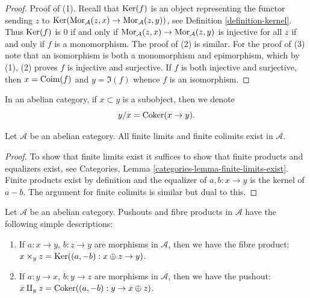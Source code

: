 \begin{proof}
Proof of (1). Recall that $\mathop{\mathrm{Ker}}(f)$ is an
object representing the
functor sending $z$ to
$\mathop{\mathrm{Ker}}(\mathop{\mathrm{Mor}}\nolimits_\mathcal{A}(z, x) \to
\mathop{\mathrm{Mor}}\nolimits_\mathcal{A}(z, y))$, see
Definition \ref{definition-kernel}.
Thus $\mathop{\mathrm{Ker}}(f)$ is $0$ if and only if
$\mathop{\mathrm{Mor}}\nolimits_\mathcal{A}(z, x) \to
\mathop{\mathrm{Mor}}\nolimits_\mathcal{A}(z, y)$
is injective for all $z$ if and only if $f$
is a monomorphism.
The proof of (2) is similar.
For the proof of (3) note that an isomorphism
is both a monomorphism
and epimorphism, which by (1), (2) proves $f$
is injective
and surjective. If $f$ is both injective and
surjective, then
$x = \mathop{\mathrm{Coim}}(f)$ and $y = \Im(f)$ whence $f$ is
an isomorphism.
\end{proof}

\noindent
In an abelian category, if $x \subset y$ is a
subobject,
then we denote
$$
y/x = \mathop{\mathrm{Coker}}(x \to y).
$$

\begin{lemma}
\label{lemma-colimit-abelian-category}
Let $\mathcal{A}$ be an abelian category.
All finite limits and finite colimits exist
in $\mathcal{A}$.
\end{lemma}

\begin{proof}
To show that finite limits exist it suffices
to show
that finite products and equalizers exist,
see
Categories, Lemma
\ref{categories-lemma-finite-limits-exist}.
Finite products exist
by definition and the equalizer of $a, b : x
\to y$ is
the kernel of $a - b$. The argument for
finite colimits
is similar but dual to this.
\end{proof}

\begin{example}
\label{example-fibre-product-pushouts}
Let $\mathcal{A}$ be an abelian category.
Pushouts and fibre products in $\mathcal{A}$
have the following
simple descriptions:
\begin{enumerate}
\item If $a : x \to y$, $b : z \to y$ are
morphisms in $\mathcal{A}$, then
we have the fibre product:
$x \times_y z = \mathop{\mathrm{Ker}}((a, -b) : x \oplus z \to
y)$.
\item If $a : y \to x$, $b : y \to z$ are
morphisms in $\mathcal{A}$, then
we have the pushout:
$x \amalg_y z = \mathop{\mathrm{Coker}}((a, -b) : y \to x
\oplus z)$.
\end{enumerate}
\end{example}

